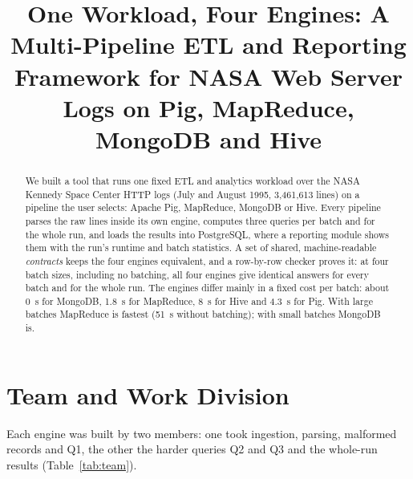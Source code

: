 \documentclass[conference]{IEEEtran}
\begin{document}
\title{One Workload, Four Engines: A Multi-Pipeline ETL and Reporting Framework for NASA Web
Server Logs on Pig, MapReduce, MongoDB and Hive}

\author{
}

\maketitle

\begin{abstract}
We built a tool that runs one fixed ETL and analytics workload over the NASA Kennedy Space Center
HTTP logs (July and August 1995, 3,461,613 lines) on a pipeline the user selects: Apache Pig,
MapReduce, MongoDB or Hive. Every pipeline parses the raw lines inside its own engine, computes
three queries per batch and for the whole run, and loads the results into PostgreSQL, where a
reporting module shows them with the run's runtime and batch statistics. A set of shared,
machine-readable \emph{contracts} keeps the four engines equivalent, and a row-by-row checker
proves it: at four batch sizes, including no batching, all four engines give identical answers
for every batch and for the whole run. The engines differ mainly in a fixed cost per batch:
about 0~s for MongoDB, 1.8~s for MapReduce, 8~s for Hive and 4.3~s for Pig. With large
batches MapReduce is fastest (51~s without batching); with small batches MongoDB is.
\end{abstract}

\section{Team and Work Division}
Each engine was built by two members: one took ingestion, parsing, malformed records and Q1, the
other the harder queries Q2 and Q3 and the whole-run results (Table~\ref{tab:team}).
\end{document}
